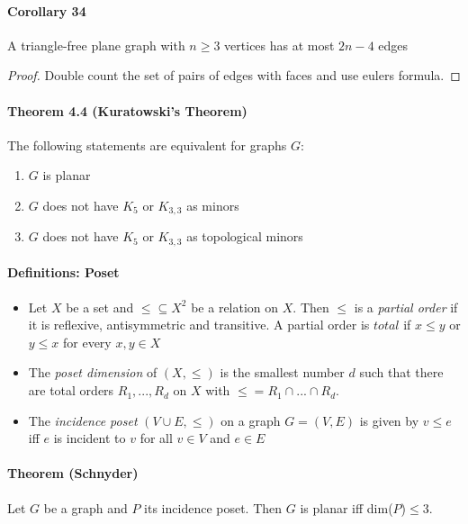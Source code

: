 \paragraph{Corollary 34} A triangle-free plane graph with $n \geq 3$ vertices 
has at most $2n -4$ edges
\begin{proof}
    Double count the set of pairs of edges with faces and use eulers formula.
\end{proof}

\paragraph{Theorem 4.4 (Kuratowski's Theorem)} The following statements are 
equivalent for graphs $ G$:
\begin{enumerate}
    \item $ G $ is planar 
    \item $ G $ does not have $ K_5 $ or $ K_{3,3} $ as minors
    \item $ G $ does not have $ K_5 $ or $ K_{3,3} $ as topological minors
\end{enumerate}

\paragraph{Definitions: Poset}
\begin{itemize}
    \item  Let $X$ be a set and $\leq \subseteq X^2$ be a relation on $X$.
    Then $\leq$ is a \textit{partial order} if it is reflexive, 
    antisymmetric and transitive. A partial order is $total$ if 
    $x \leq y$ or $y \leq x$ for every $x,y \in X$

    \item The \textit{poset dimension} of $(X, \leq)$ is the smallest number 
    $d$ such that there are total orders $R_1,...,R_d$ on $X$ with
    $\leq = R_1 \cap ... \cap R_d$.

    \item The \textit{incidence poset} $(V \cup E, \leq)$ on a graph 
    $G = (V,E)$ is given by $v \leq e$ iff $e$ is incident to $v$ for 
    all $v \in V$ and $e \in E$
\end{itemize}

\paragraph{Theorem (Schnyder)} Let $G$ be a graph and $P$ its incidence poset.
Then $G$ is planar iff dim($P$)$\leq 3$.


